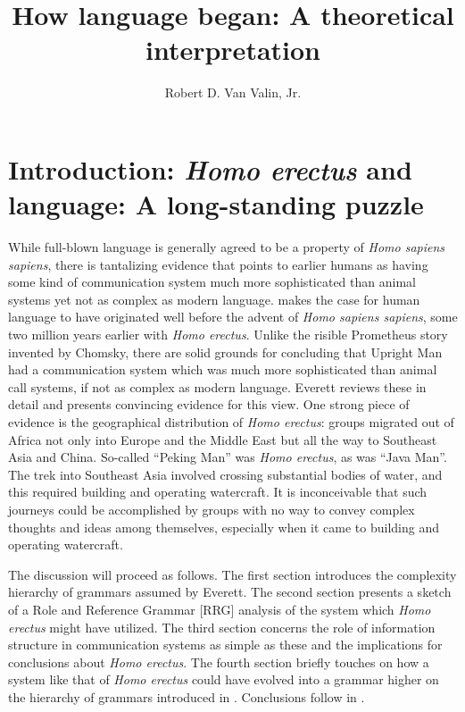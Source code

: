 \documentclass[output=paper,colorlinks,citecolor=brown]{langscibook}
\author{Robert D. Van Valin, Jr.\orcid{}\affiliation{The State University of New York at Buffalo \& Heinrich Heine University Düsseldorf}}
\title{How language began: A theoretical interpretation}
\begin{document}
\maketitle

\section{Introduction: \emph{Homo erectus} and language: A long-standing puzzle}
While full-blown language is generally agreed to be a property of \emph{Homo sapiens sapiens}, there is tantalizing evidence that points to earlier humans as having some kind of communication system much more sophisticated than animal systems yet not as complex as modern language. \citet{everett2017language} makes the case for human language to have originated well before the advent of \emph{Homo sapiens sapiens}, some two million years earlier with \emph{Homo erectus}. Unlike the risible Prometheus story invented by Chomsky, there are solid grounds for concluding that Upright Man had a communication system which was much more sophisticated than animal call systems, if not as complex as modern language.  Everett reviews these in detail and presents convincing evidence for this view.  One strong piece of evidence is the geographical distribution of \emph{Homo erectus}: groups migrated out of Africa not only into Europe and the Middle East but all the way to Southeast Asia and China.  So-called “Peking Man” was \emph{Homo erectus}, as was “Java Man”.  The trek into Southeast Asia involved crossing substantial bodies of water, and this required building and operating watercraft.  It is inconceivable that such journeys could be accomplished by groups with no way to convey complex thoughts and ideas among themselves, especially when it came to building and operating watercraft.  

The discussion will proceed as follows. The first section introduces the complexity hierarchy of grammars assumed by Everett.  The second section presents a sketch of a Role and Reference Grammar [RRG] \citep{van2005exploring,van1997syntax} analysis of the system which \emph{Homo erectus} might have utilized.  The third section concerns the role of information structure in communication systems as simple as these and the implications for conclusions about \emph{Homo erectus}.  The fourth section briefly touches on how a system like that of \emph{Homo erectus} could have evolved into a grammar higher on the hierarchy of grammars introduced in . Conclusions follow in .
\end{document}
